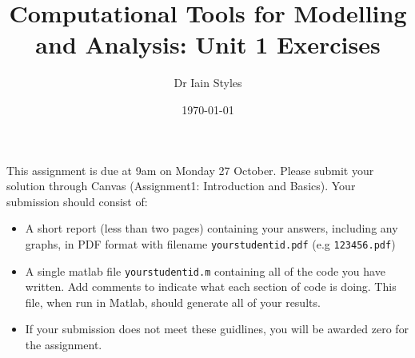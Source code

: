 \documentclass[12pt,a4paper]{tufte-handout}
\title{Computational Tools for Modelling and Analysis: Unit 1 Exercises}
\author{Dr Iain Styles}
\date{\today}
\begin{document}
\maketitle

This assignment is due at 9am on Monday 27 October. Please submit your solution through Canvas (Assignment1: Introduction and Basics). Your submission should consist of:
\begin{itemize}
  \item A short report (less than two pages) containing your answers, including any graphs, in PDF format with filename \texttt{yourstudentid.pdf} (e.g \texttt{123456.pdf})
  \item A single matlab file \texttt{yourstudentid.m} containing all of the code you have written. Add comments to indicate what each section of code is doing. This file, when run in Matlab, should generate all of your results.
  \item If your submission does not meet these guidlines, you will be awarded zero for the assignment.
\end{itemize}
\end{document}
